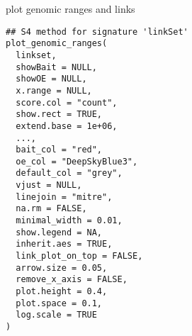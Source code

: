 \documentclass[letterpaper]{book}
\begin{document}
%
\begin{Description}
plot genomic ranges and links
\end{Description}
%
\begin{Usage}
\begin{verbatim}
## S4 method for signature 'linkSet'
plot_genomic_ranges(
  linkset,
  showBait = NULL,
  showOE = NULL,
  x.range = NULL,
  score.col = "count",
  show.rect = TRUE,
  extend.base = 1e+06,
  ...,
  bait_col = "red",
  oe_col = "DeepSkyBlue3",
  default_col = "grey",
  vjust = NULL,
  linejoin = "mitre",
  na.rm = FALSE,
  minimal_width = 0.01,
  show.legend = NA,
  inherit.aes = TRUE,
  link_plot_on_top = FALSE,
  arrow.size = 0.05,
  remove_x_axis = FALSE,
  plot.height = 0.4,
  plot.space = 0.1,
  log.scale = TRUE
)
\end{verbatim}
\end{Usage}
%
\end{document}
